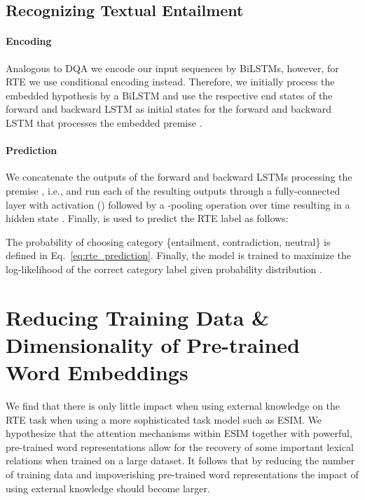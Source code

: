 \documentclass[11pt,a4paper]{article}
\begin{document}
\subsection{Recognizing Textual Entailment}\label{sec:rte_impl}

\paragraph{Encoding} Analogous to DQA we encode our input sequences by BiLSTMs, however, for RTE we use conditional encoding \citep{Rocktschel2015} instead. Therefore, we initially process the embedded hypothesis  by a BiLSTM and use the respective end states of the forward and backward LSTM as initial states for the forward and backward LSTM that processes the embedded premise . 

\paragraph{Prediction} We concatenate the outputs of the forward and backward LSTMs processing the premise , i.e.,  and run each of the resulting  outputs through a fully-connected layer with  activation () followed by a -pooling operation over time resulting in a hidden state . Finally,  is used to predict the RTE label as follows:


\noindent The probability of choosing category  \{entailment, contradiction, neutral\} is defined in Eq.~\ref{eq:rte_prediction}. Finally, the model is trained to maximize the log-likelihood of the correct category label given probability distribution .


\section{Reducing Training Data \& Dimensionality of Pre-trained Word Embeddings}
\label{sec:reduction_experiments}
We find that there is only little impact when using external knowledge on the RTE task when using a more sophisticated task model such as ESIM. We hypothesize that the attention mechanisms within ESIM together with powerful, pre-trained word representations allow for the recovery of some important lexical relations when trained on a large dataset. It follows that by reducing the number of training data and impoverishing pre-trained word representations the impact of using external knowledge should become larger.
\end{document}
